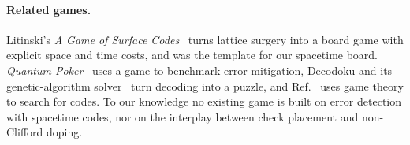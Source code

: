 \paragraph*{Related games.} Litinski's \emph{A Game of Surface Codes}~\cite{litinski2019game,pennylane_game} turns lattice surgery into a board game with explicit space and time costs, and was the template for our spacetime board. \emph{Quantum Poker}~\cite{fuchs2019poker} uses a game to benchmark error mitigation, Decodoku and its genetic-algorithm solver~\cite{wootton2016minimal,genetic_decodoku} turn decoding into a puzzle, and Ref.~\cite{guerrero2025nash} uses game theory to search for codes. To our knowledge no existing game is built on error detection with spacetime codes, nor on the interplay between check placement and non-Clifford doping.

